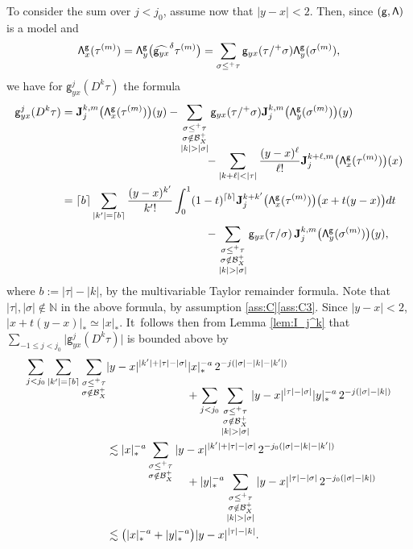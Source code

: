 \documentclass[JEP,XML,SOM,Unicode,published]{cedram}
\theoremstyle{plain}
\theoremstyle{definition}
\newcommand{\bfJ}{\mathbf{J}}
\newcommand{\sfg}{\mathsf{g}}
\newcommand{\bbN}{\mathbb{N}}
\newcommand{\mcB}{\mathcal{B}}
\begin{document}
To consider the sum over $j<j_0$, assume now that $|y-x|<2$. Then, since $\sf (g, \Lambda)$ is a model and
\begin{align*}
{\sf\Lambda}^{\sfg}_x(\tau^{(m)}) = {\sf\Lambda}^{\sfg}_y\bigl(\widehat{{\sf g}_{yx}}^{\delta}\tau^{(m)}\bigr) = \sum_{\sigma\le^+\tau}\sfg_{yx}(\tau/^+\sigma){\sf\Lambda}^{\sfg}_y(\sigma^{(m)}),
\end{align*}
we have for $\sfg_{yx}^j(D^k\tau)$ the formula
\begin{align*}
\sfg_{yx}^j(D^k\tau)
&=\bfJ_j^{k,m}\bigl({\sf\Lambda}^{\sfg}_x(\tau^{(m)})\bigr)(y) - \sum_{\substack{\sigma\le^+\tau\\ \sigma\notin\mcB_X^+\\|k|>|\sigma|}} \sfg_{yx}(\tau/^+\sigma)\bfJ_j^{k,m}\bigl({\sf\Lambda}^{\sfg}_y(\sigma^{(m)})\bigr)(y) \\[-10pt]
&\hspace*{4.5cm}- \sum_{|k+\ell|<|\tau|}\frac{(y-x)^\ell}{\ell!}\bfJ_j^{k+\ell, m}\bigl({\sf\Lambda}^{\sfg}_x(\tau^{(m)})\bigr)(x) \\
&= \lceil b\rceil\sum_{|k'|=\lceil b \rceil}\frac{(y-x)^{k'}}{{k'}!}\int_0^1(1-t)^{\lceil b\rceil}\bfJ_j^{k+{k'}}\bigl({\sf\Lambda}^{\sfg}_x(\tau^{(m)})\bigr)\bigl(x+t(y-x)\bigr)dt \\
&\hspace*{4.5cm}- \sum_{\substack{\sigma\le^+\tau\\\sigma\notin\mcB_X^+\\|k|>|\sigma|}}\sfg_{yx}(\tau/\sigma)\,\bfJ_j^{k,m}\bigl({\sf\Lambda}^\sfg_y(\sigma^{(m)})\bigr)(y),
\end{align*}
where $b\!:=\!|\tau|-|k|$, by the multivariable Taylor remainder formula. Note that $|\tau|,|\sigma|\!\notin\!\bbN$ in the above formula, by assumption \ref{ass:C}\eqref{ass:C3}. Since $|y-x|<2$, $|x+t(y-x)|_*\simeq|x|_*$. It~follows then from Lemma \ref{lem:I_j^k} that $\sum_{-1\leq j<j_0}\big|\sfg_{yx}^j(D^k\tau)\big|$ is bounded above by\vspace*{-3pt}
\begin{align*}
\sum_{j<j_0}\sum_{|{k'}|=\lceil b\rceil}\sum_{\substack{\sigma\leq^+\tau\\\sigma\notin\mcB_X^+}}& |y-x|^{|{k'}|+|\tau|-|\sigma|}|x|_*^{-a}\,2^{-j(|\sigma|-|k|-|{k'}|)} \\[-15pt]
&\hspace*{2.5cm}+ \sum_{j<j_0}\sum_{\substack{\sigma\le^+\tau\\\sigma\notin\mcB_X^+\\|k|>|\sigma|}} |y-x|^{|\tau|-|\sigma|}|y|_*^{-a}\,2^{-j(|\sigma|-|k|)} \\
&\lesssim |x|_*^{-a}\sum_{\substack{\sigma\leq^+\tau\\\sigma\notin\mcB_X^+}} |y-x|^{|{k'}|+|\tau|-|\sigma|}\,2^{-j_0(|\sigma|-|k|-|{k'}|)} \\[-12pt]
&\hspace*{2.5cm}+ |y|_*^{-a}\sum_{\substack{\sigma\le^+\tau\\\sigma\notin\mcB_X^+\\|k|>|\sigma|}}|y-x|^{|\tau|-|\sigma|}\,2^{-j_0(|\sigma|-|k|)} \\
&\lesssim\bigl(|x|_*^{-a}+|y|_*^{-a}\bigr)|y-x|^{|\tau|-|k|}.
\end{align*}
\end{document}
